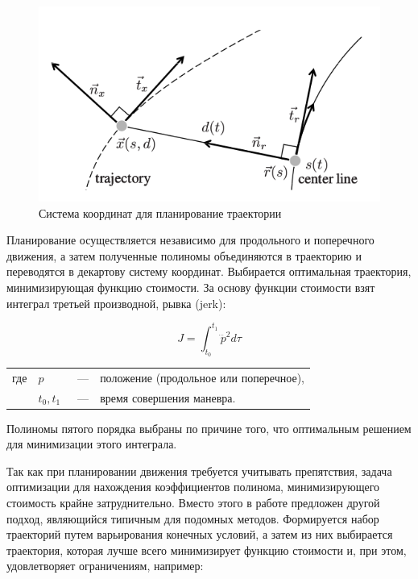 \begin{figure}[h]
    \centering
    \includegraphics[]{images/junior_frenet_frame}
    \caption{Система координат для планирование траектории}
    \label{img:junior_frenet_frame}
\end{figure}


Планирование осуществляется независимо для продольного и поперечного движения,
а затем полученные полиномы объединяются в траекторию и переводятся в декартову систему координат.
Выбирается оптимальная траектория, минимизирующая функцию стоимости. За основу функции стоимости взят
интеграл третьей производной, рывка (jerk):

\begin{equation}
    J= \int_{t_0}^{t_1}{\dddot{p}^2 d\tau}
\end{equation}

\noindent\begin{tabularx}{\linewidth}{lllX}
    где & $p$         &~---& положение (продольное или поперечное), \\
        & $t_0, t_1$  &~---& время совершения маневра.
\end{tabularx}

Полиномы пятого порядка выбраны по причине того, что оптимальным решением для минимизации этого
интеграла.

Так как при планировании движения требуется учитывать препятствия, задача оптимизации для
нахождения коэффициентов полинома, минимизирующего стоимость крайне затруднительно. Вместо этого
в работе предложен другой подход, являющийся типичным для подомных методов. Формируется набор
траекторий путем варьирования конечных условий, а затем из них выбирается траектория, которая
лучше всего минимизирует функцию стоимости и, при этом, удовлетворяет ограничениям, например:

